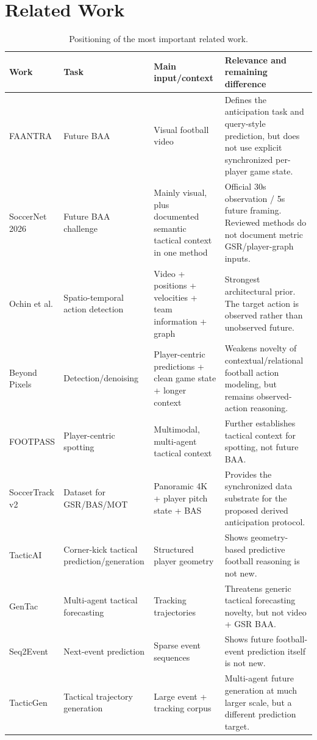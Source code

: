 \documentclass[11pt,a4paper]{article}
\begin{document}
\section{Related Work}
\begin{table}[H]
\centering
\caption{Positioning of the most important related work.}
\small
\begin{tabularx}{\textwidth}{p{2.7cm}p{2.4cm}p{2.7cm}X}
\toprule
\textbf{Work} & \textbf{Task} & \textbf{Main input/context} & \textbf{Relevance and remaining difference} \\
\midrule
FAANTRA \citep{dalal2025faantra} & Future BAA & Visual football video & Defines the anticipation task and query-style prediction, but does not use explicit synchronized per-player game state. \\
SoccerNet 2026 \citep{cioppa2026soccernet} & Future BAA challenge & Mainly visual, plus documented semantic tactical context in one method & Official 30s observation / 5s future framing. Reviewed methods do not document metric GSR/player-graph inputs. \\
Ochin et al. \citep{ochin2025gamestate} & Spatio-temporal action detection & Video + positions + velocities + team information + graph & Strongest architectural prior. The target action is observed rather than unobserved future. \\
Beyond Pixels \citep{ochin2025beyond} & Detection/denoising & Player-centric predictions + clean game state + longer context & Weakens novelty of contextual/relational football action modeling, but remains observed-action reasoning. \\
FOOTPASS \citep{ochin2025footpass} & Player-centric spotting & Multimodal, multi-agent tactical context & Further establishes tactical context for spotting, not future BAA. \\
SoccerTrack v2 \citep{scott2025soccertrack} & Dataset for GSR/BAS/MOT & Panoramic 4K + player pitch state + BAS & Provides the synchronized data substrate for the proposed derived anticipation protocol. \\
TacticAI \citep{wang2024tacticai} & Corner-kick tactical prediction/generation & Structured player geometry & Shows geometry-based predictive football reasoning is not new. \\
GenTac \citep{rao2026gentac} & Multi-agent tactical forecasting & Tracking trajectories & Threatens generic tactical forecasting novelty, but not video + GSR BAA. \\
Seq2Event \citep{simpson2022seq2event} & Next-event prediction & Sparse event sequences & Shows future football-event prediction itself is not new. \\
TacticGen \citep{xu2026tacticgen} & Tactical trajectory generation & Large event + tracking corpus & Multi-agent future generation at much larger scale, but a different prediction target. \\
\bottomrule
\end{tabularx}
\end{table}
\end{document}
